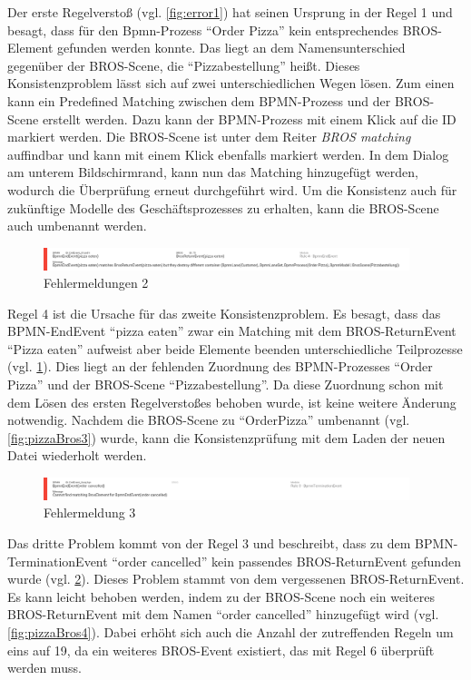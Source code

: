 Der erste Regelverstoß (vgl. \cref{fig:error1}) hat seinen Ursprung in der Regel 1 und besagt, dass für den Bpmn-Prozess ``Order Pizza'' kein entsprechendes BROS-Element gefunden werden konnte.
Das liegt an dem Namensunterschied gegenüber der BROS-Scene, die ``Pizzabestellung'' heißt.
Dieses Konsistenzproblem lässt sich auf zwei unterschiedlichen Wegen lösen.
Zum einen kann ein Predefined Matching zwischen dem BPMN-Prozess und der BROS-Scene erstellt werden.
Dazu kann der BPMN-Prozess mit einem Klick auf die ID markiert werden.
Die BROS-Scene ist unter dem Reiter \emph{BROS matching} auffindbar und kann mit einem Klick ebenfalls markiert werden.
In dem Dialog am unterem Bildschirmrand, kann nun das Matching hinzugefügt werden, wodurch die Überprüfung erneut durchgeführt wird.
Um die Konsistenz auch für zukünftige Modelle des Geschäftsprozesses zu erhalten, kann die BROS-Scene auch umbenannt werden.

\begin{figure}[H]
    \centering
     \includegraphics[width=0.95\textwidth,keepaspectratio]{../images/example/error2.png}%
    \caption{Fehlermeldungen 2}%
    \label{fig:error2}
\end{figure}

Regel 4 ist die Ursache für das zweite Konsistenzproblem.
Es besagt, dass das BPMN-EndEvent ``pizza eaten'' zwar ein Matching mit dem BROS-ReturnEvent ``Pizza  eaten'' aufweist aber beide Elemente beenden unterschiedliche Teilprozesse (vgl. \cref{fig:error2}).
Dies liegt an der fehlenden Zuordnung des BPMN-Prozesses ``Order Pizza'' und der BROS-Scene ``Pizzabestellung''.
Da diese Zuordnung schon mit dem Lösen des ersten Regelverstoßes behoben wurde, ist keine weitere Änderung notwendig.
Nachdem die BROS-Scene zu ``OrderPizza'' umbenannt (vgl. \cref{fig:pizzaBros3}) wurde, kann die Konsistenzprüfung mit dem Laden der neuen Datei wiederholt werden.

\begin{figure}[H]
    \centering
    \includegraphics[width=0.95\textwidth,keepaspectratio]{../images/example/error3.png}%
    \caption{Fehlermeldung 3}%
    \label{fig:error3}
\end{figure}

Das dritte Problem kommt von der Regel 3 und beschreibt, dass zu dem BPMN-TerminationEvent ``order cancelled'' kein passendes BROS-ReturnEvent gefunden wurde (vgl. \cref{fig:error3}).
Dieses Problem stammt von dem vergessenen BROS-ReturnEvent.
Es kann leicht behoben werden, indem zu der BROS-Scene noch ein weiteres BROS-ReturnEvent mit dem Namen ``order cancelled'' hinzugefügt wird (vgl. \cref{fig:pizzaBros4}). 
Dabei erhöht sich auch die Anzahl der zutreffenden Regeln um eins auf 19, da ein weiteres BROS-Event existiert, das mit Regel 6 überprüft werden muss.

